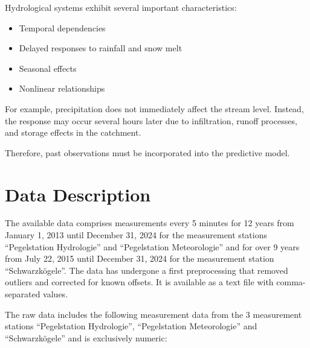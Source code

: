 \documentclass[a4paper,12pt]{article}
\begin{document}
Hydrological systems exhibit several important characteristics:

\begin{itemize}
    \item Temporal dependencies
    \item Delayed responses to rainfall and snow melt
    \item Seasonal effects
    \item Nonlinear relationships
\end{itemize}

For example, precipitation does not immediately affect the stream level. Instead, the response may occur several hours later due to infiltration, runoff processes, and storage effects in the catchment.

Therefore, past observations must be incorporated into the predictive model.

\section{Data Description}

The available data comprises measurements every 5 minutes for 12 years from January 1, 2013 until December 31, 2024 for the measurement stations ``Pegelstation Hydrologie'' and ``Pegelstation Meteorologie'' and for over 9 years from July 22, 2015 until December 31, 2024 for the measurement station ``Schwarzkögele''. The data has undergone a first preprocessing that removed outliers and corrected for known offsets. It is available as a text file with comma-separated values.

The raw data includes the following measurement data from the 3 measurement stations ``Pegelstation Hydrologie'', ``Pegelstation Meteorologie'' and ``Schwarzkögele'' and is exclusively numeric:
\end{document}
